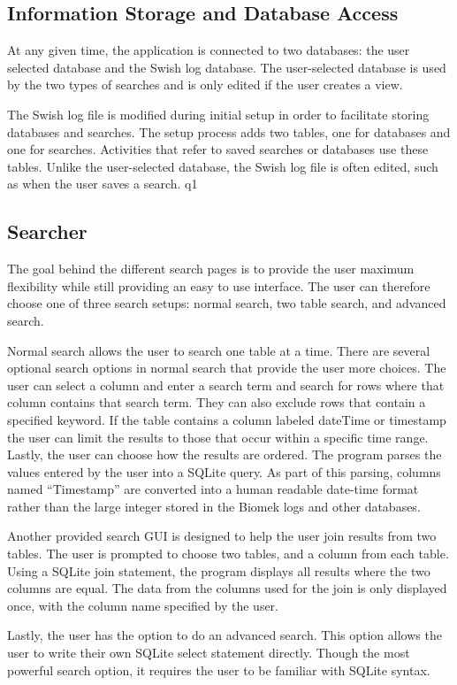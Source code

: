 \documentclass[letterpaper,11pt,twoside,final]{article}
\begin{document}
\subsection*{Information Storage and Database Access}
At any given time, the application is connected to two databases: the
user selected database and the Swish log database. The user-selected
database is used by the two types of searches and is only edited if
the user creates a view.

The Swish log file is modified during initial setup in order to facilitate storing
databases and searches. The setup process adds two tables,
one for databases and one for searches. Activities that refer to saved
  searches or databases use these tables. Unlike the user-selected database,
the Swish log file is often edited, such as when the user saves a
search.
q1
\subsection*{Searcher}
The goal behind the different search pages is to provide the user maximum
flexibility while still providing an easy to use interface. The user
can therefore choose one of three search setups: normal search, two
table search, and advanced search.

Normal search allows the user to
search one table at a time. There are several optional search options
in normal search that provide the user more choices. The user can
select a column and enter a search term and search for rows where that
column contains that search term. They can also exclude rows that
contain a specified keyword. If the table contains a column labeled
dateTime or timestamp the user can limit the results to those that
occur within a specific time range. Lastly, the user can choose how
the results are ordered. 
The program parses the values entered by the user into a SQLite
query. As part of this parsing, columns named ``Timestamp'' are
converted into a human readable date-time format rather than the large
integer stored in the Biomek logs and other databases.

Another provided search GUI is designed to help the user join results
from two tables. The user is prompted to choose two tables, and a
column from each table. Using a SQLite join statement, the program
displays all results where the two columns are equal. The data from
the columns used for the join is only displayed once, with the column
name specified by the user.

Lastly, the user has the option to do an advanced search. This option
allows the user to write their own SQLite select statement
directly. Though the most powerful search option, it requires the
user to be familiar with SQLite syntax.
\end{document}
